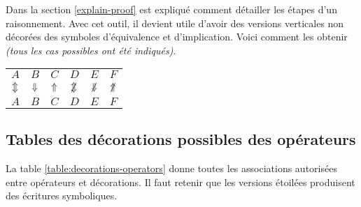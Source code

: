 \documentclass[12pt,a4paper]{article}
\theoremstyle{definition}
\begin{document}
Dans la section \ref{explain-proof} est expliqué comment détailler les étapes d'un raisonnement. Avec cet outil, il devient utile d'avoir des versions verticales non décorées des symboles d'équivalence et d'implication. Voici comment les obtenir \emph{(tous les cas possibles ont été indiqués)}.

\begin{latexex}
\begin{tabular}{cccccc}
  $A$            & $B$
& $C$            & $D$
& $E$            & $F$
\\
  $\mathrel{\Updownarrow}$        & $\mathrel{\Downarrow}$  
& $\mathrel{\Uparrow}$    & $\notviff$
& $\notvimplies$ & $\notvliesimp$
\\
  $A$            & $B$
& $C$            & $D$
& $E$            & $F$
\end{tabular}
\end{latexex}



\subsection{Tables des décorations possibles des opérateurs}

La table \ref{table:decorations-operators}  donne toutes les associations autorisées entre opérateurs et décorations.
Il faut retenir que les versions étoilées produisent des écritures symboliques. 


\end{document}
